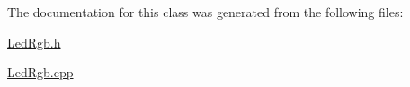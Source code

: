 The documentation for this class was generated from the following files\+:\begin{DoxyCompactItemize}
\item 
\hyperlink{_led_rgb_8h}{Led\+Rgb.\+h}\item 
\hyperlink{_led_rgb_8cpp}{Led\+Rgb.\+cpp}\end{DoxyCompactItemize}
